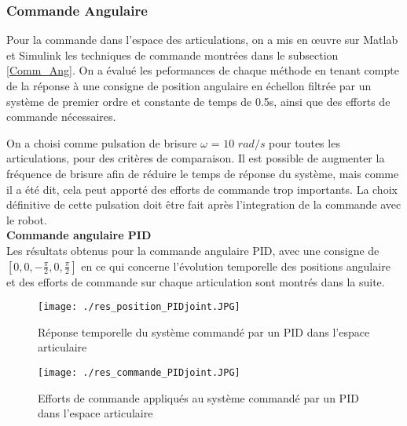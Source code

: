 
\subsubsection{Commande Angulaire}

Pour la commande dans l'espace des articulations, on a mis en \oe{}uvre sur Matlab et Simulink les techniques de commande montrées dans le subsection \ref{Comm_Ang}. On a évalué les peformances de chaque méthode en tenant compte de la réponse à une consigne de position angulaire en échellon filtrée par un système de premier ordre et constante de temps de 0.5s, ainsi que des efforts de commande nécessaires. 

On a choisi comme pulsation de brisure $ \omega$ = $ 10$ $rad/s $ pour toutes les articulations, pour des critères de comparaison. Il est possible de augmenter la fréquence de brisure afin de réduire le temps de réponse du système, mais comme il a été dit, cela peut apporté des efforts de commande trop importants. La choix définitive de cette pulsation doit être fait après l'integration de la commande avec le robot.
\\

\textbf{Commande angulaire PID}
\\

Les résultats obtenus pour la commande angulaire PID, avec une consigne de $ \left[0, 0, -\frac{\pi}{2}, 0, \frac{\pi}{2} \right] $ en ce qui concerne l'évolution temporelle des positions angulaire et des efforts de commande sur chaque articulation sont montrés dans la suite.

\begin{figure}[H]
	\begin{center}	
		\captionsetup{justification=centering,margin=1cm}
		\texttt{[image: ./res\_position\_PIDjoint.JPG]}
		\caption{Réponse temporelle du système commandé par un PID dans l'espace articulaire}
		\label{fig:PID_joint_space_response}
	\end{center}
\end{figure}

\begin{figure}[H]
	\begin{center}
		\captionsetup{justification=centering,margin=1cm}	
		\texttt{[image: ./res\_commande\_PIDjoint.JPG]}
		\caption{Efforts de commande appliqués au système commandé par un PID dans l'espace articulaire }
		\label{fig:PIDjointcontgraph}
	\end{center}
\end{figure}

